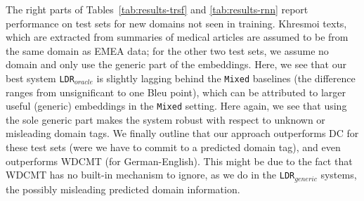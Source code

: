 \documentclass[11pt,a4paper]{article}
\newcommand{\fyTodo}[1]{\Todo[FY:]{\textcolor{orange}{#1}}}
\begin{document}

The right parts of Tables~\ref{tab:results-trsf} and \ref{tab:results-rnn} report performance on test sets for new domains not seen in training. Khresmoi texts, which are extracted from summaries of medical articles are assumed to be from the same domain as EMEA data; for the other two test sets, we assume no domain and only use the generic part of the embeddings. Here, we see that our best system \texttt{LDR}$_{oracle}$ is slightly lagging behind the \texttt{Mixed} baselines (the difference ranges from unsignificant to one Bleu point), which can be attributed to larger useful (generic) embeddings in the \texttt{Mixed} setting. Here again, we see that using the sole generic part makes the system robust with respect to unknown or misleading domain tags. We finally outline that our approach outperforms DC for these test sets (were we have to commit to a predicted domain tag), and even outperforms WDCMT (for German-English). This might be due to the fact that WDCMT has no built-in mechanism to ignore, as we do in the \texttt{LDR}$_{generic}$ systems, the possibly misleading predicted domain information.
\end{document}
